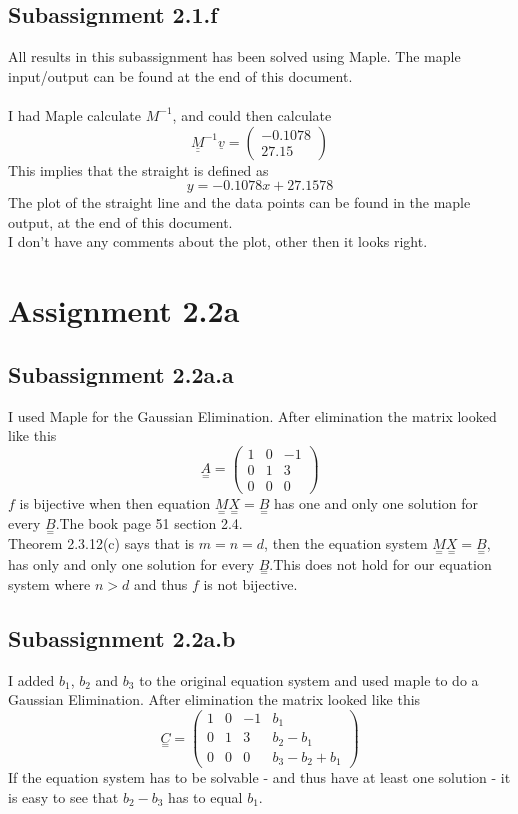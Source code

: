 \documentclass[english]{article}
\begin{document}
\subsection*{Subassignment 2.1.f}
All results in this subassignment has been solved using Maple. The maple input/output can be found at the end of this document.\\\\
I had Maple calculate $M^{-1}$, and could then calculate
\begin{equation}
 \underline{\underline{M}}^{-1} \underline{v} = \begin{pmatrix} -0.1078 \\ 27.15 \end{pmatrix}
\end{equation}
This implies that the straight is defined as
\begin{equation}
y=-0.1078x+27.1578
\end{equation}
The plot of the straight line and the data points can be found in the maple output, at the end of this document.\\ I don't have any comments about the plot, other then it looks right.
\newpage
\section*{Assignment 2.2a}
\subsection*{Subassignment 2.2a.a}
I used Maple for the Gaussian Elimination. After elimination the matrix looked like this
\begin{equation} \underset{=}{A} =
	\begin{pmatrix}
		1 & 0 & -1 \\
		0 & 1 & 3 \\
		0 & 0 & 0
	\end{pmatrix}
\end{equation}
$f$ is bijective when then equation $\underset{=}{M} \underset{=}{X} = \underset{=}{B}$ has one and only one solution for every $\underset{=}{B}$.The book page 51 section 2.4.\\
Theorem 2.3.12(c) says that is $m=n=d$, then the equation system $\underset{=}{M} \underset{=}{X} = \underset{=}{B}$, has only and only one solution for every $\underset{=}{B}$.This does not hold for our equation system where $n>d$ and thus $f$ is not bijective.
\subsection*{Subassignment 2.2a.b}
I added $b_1$, $b_2$ and $b_3$ to the original equation system and used maple to do a Gaussian Elimination.  After elimination the matrix looked like this
\begin{equation} \underset{=}{C}=
	\begin{pmatrix}
		1 & 0 & -1 &  b_1 \\
		0 & 1 & 3 &   b_2-b_1\\
		0 & 0 & 0 &  b_3-b_2+b_1
	\end{pmatrix}
\end{equation}
If the equation system has to be solvable - and thus have at least one solution -  it is easy to see that $b_2-b_3$ has to equal $b_1$.
\end{document}
